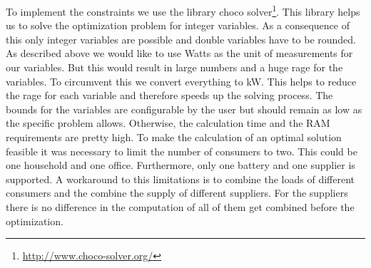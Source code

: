 To implement the constraints we use the library choco solver\footnote{\url{http://www.choco-solver.org/}}. This library helps us to solve the optimization problem for integer variables. As a consequence of this only integer variables are possible and double variables have to be rounded. As described above we would like to use Watts as the unit of measurements for our variables. But this would result in large numbers and a huge rage for the variables. To circumvent this we convert everything to kW. This helps to reduce the rage for each variable and therefore speeds up the solving process. The bounds for the variables are configurable by the user but should remain as low as the specific problem allows. Otherwise, the calculation time and the RAM requirements are pretty high. To make the calculation of an optimal solution feasible it was necessary to limit the number of consumers to two. This could be one household and one office. Furthermore, only one battery and one supplier is supported. A workaround to this limitations is to combine the loads of different consumers and the combine the supply of different suppliers. For the suppliers there is no difference in the computation of all of them get combined before the optimization.